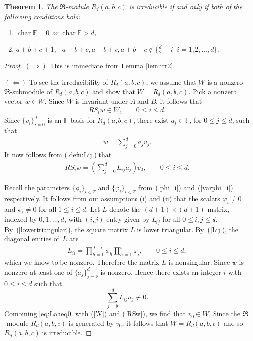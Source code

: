 \documentclass[pdftex]{sigma}
\def\F{\mathbb F}
\def\Z{\mathbb Z}
\numberwithin{equation}{section}
\newtheorem{Theorem}{Theorem}[section]
\begin{document}
\begin{Theorem}\label{thm:irrR}The $\Re$-module $R_d(a,b,c)$ is irreducible if and only if both of the following conditions hold:
\begin{enumerate}\itemsep=0pt
\item[$(i)$] $\operatorname{char} \F=0$ or $\operatorname{char} \F>d$,
\item[$(ii)$] $a+b+c+1, -a+b+c, a-b+c, a+b-c\not\in \big\{
 \frac{d}{2}-i \,\big|\,i=1,2,\ldots,d\big\}$.
\end{enumerate}
\end{Theorem}
\begin{proof}$(\Rightarrow)$ This is immediate from Lemma \ref{lem:irr2}.

$(\Leftarrow)$ To see the irreducibility of $R_d(a,b,c)$, we assume that $W$ is a nonzero $\Re$-submodule of $R_d(a,b,c)$ and show that $W=R_d(a,b,c)$. Pick a nonzero vector $w\in W$. Since $W$ is invariant under $A$ and $B$, it follows that
\begin{gather}\label{W}
R S_i w\in W, \qquad 0\leq i\leq d.
\end{gather}
Since $\{v_i\}_{i=0}^d$ is an $\F$-basis for $R_d(a,b,c)$, there exist $a_j\in \F$, for $0\leq j\leq d$, such that
\begin{gather*}
w=\sum_{j=0}^d a_j v_j.
\end{gather*}
It now follows from (\ref{defn:Lij}) that
\begin{gather}\label{RSw}
RS_i w=\left(\sum_{j=0}^d L_{ij} a_j\right) v_0, \qquad 0\leq i\leq d.
\end{gather}

Recall the parameters $\{\phi_i\}_{i\in \Z}$ and $\{\varphi_i\}_{i\in \Z}$ from~(\ref{phi_i}) and~(\ref{varphi_i}), respectively. It follows from our assumptions (i) and (ii) that the scalars $\varphi_i\not=0$ and $\phi_i\not=0$ for all $1\leq i\leq d$. Let $L$ denote the $(d+1)\times (d+1)$ matrix, indexed by $0,1,\ldots,d$, with $(i,j)$-entry given by $L_{ij}$ for all $0\leq i,j\leq d$.
By~(\ref{lowertriangular}), the square matrix $L$ is lower triangular. By~(\ref{Lij}), the diagonal entries of~$L$ are
\begin{gather*}
L_{ii}=\prod_{h=1}^{d-i} \phi_h \prod_{h=1}^{i}\varphi_i,\qquad 0\leq i\leq d,
\end{gather*}
which we know to be nonzero. Therefore the matrix $L$ is nonsingular. Since $w$ is nonzero at least one of $\{a_j\}_{j=0}^d$ is nonzero. Hence there exists an integer $i$ with $0\leq i\leq d$ such that
\begin{equation}
\sum_{j=0}^d L_{ij} a_j\not=0.\label{eq:Laneq0}
\end{equation}
Combining \eqref{eq:Laneq0} with (\ref{W}) and (\ref{RSw}), we find that $v_0\in W$. Since the $\Re$-module $R_d(a,b,c)$ is generated by $v_0$, it follows that $W=R_d(a,b,c)$ and so $R_d(a,b,c)$ is irreducible.
\end{proof}
\end{document}
